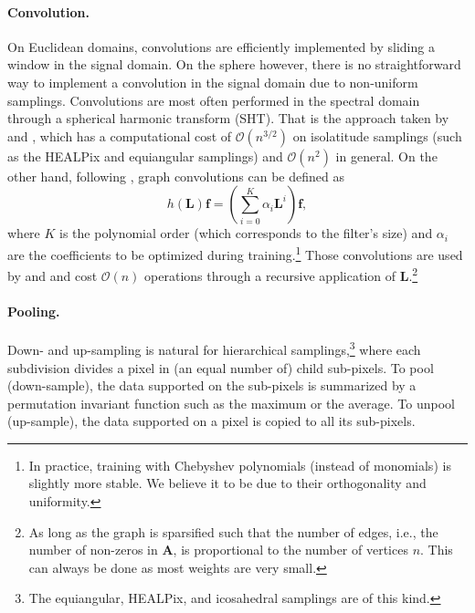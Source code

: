 \documentclass{article} %
\renewcommand{\b}[1]{{\bm{#1}}}  %
\newcommand{\bO}{\mathcal{O}}
\begin{document}
\paragraph{Convolution.} \label{sec:method:convolution}
On Euclidean domains, convolutions are efficiently implemented by sliding a window in the signal domain.
On the sphere however, there is no straightforward way to implement a convolution in the signal domain due to non-uniform samplings.
Convolutions are most often performed in the spectral domain through a spherical harmonic transform (SHT).
That is the approach taken by \citet{cohen2018sphericalcnn} and \citet{esteves2018sphericalcnn}, which has a computational cost of $\bO(n^{3/2})$ on isolatitude samplings (such as the HEALPix and equiangular samplings) and $\bO(n^2)$ in general.
On the other hand, following \citet{defferrard2016graphnn}, graph convolutions can be defined as
\begin{equation} \label{eqn:graph_conv}
	h(\b{L}) \b{f} = \left(\sum_{i=0}^K \alpha_i \b{L}^i\right) \b{f},
\end{equation}
where $K$ is the polynomial order (which corresponds to the filter's size) and $\alpha_i$ are the coefficients to be optimized during training.\footnote{In practice, training with Chebyshev polynomials (instead of monomials) is slightly more stable. We believe it to be due to their orthogonality and uniformity.}
Those convolutions are used by \citet{khasanova2017sphericalcnn} and \citet{perraudin2019deepspherecosmo} and cost $\bO(n)$ operations through a recursive application of $\b{L}$.\footnote{As long as the graph is sparsified such that the number of edges, i.e., the number of non-zeros in $\b{A}$, is proportional to the number of vertices $n$. This can always be done as most weights are very small.}

\paragraph{Pooling.}
Down- and up-sampling is natural for hierarchical samplings,\footnote{The equiangular, HEALPix, and icosahedral samplings are of this kind.} where each subdivision divides a pixel in (an equal number of) child sub-pixels.
To pool (down-sample), the data supported on the sub-pixels is summarized by a permutation invariant function such as the maximum or the average.
To unpool (up-sample), the data supported on a pixel is copied to all its sub-pixels.
\end{document}
